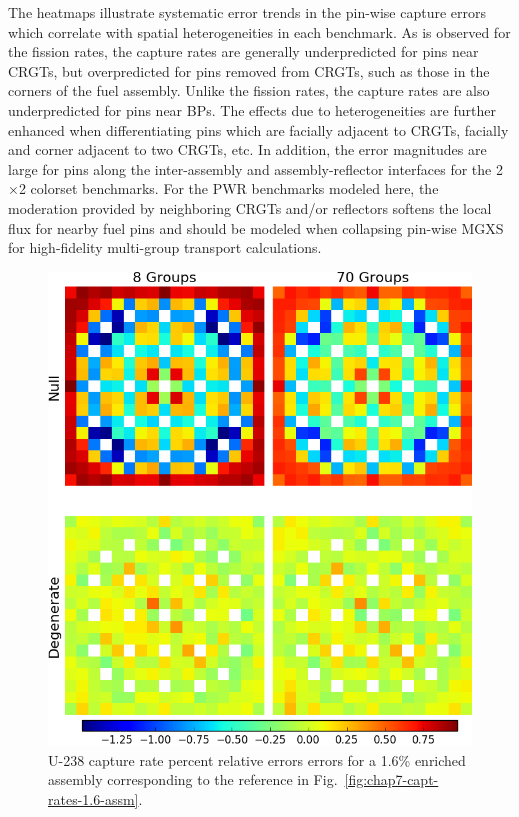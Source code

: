 The heatmaps illustrate systematic error trends in the pin-wise capture errors which correlate with spatial heterogeneities in each benchmark. As is observed for the fission rates, the capture rates are generally underpredicted for pins near \acp{CRGT}, but overpredicted for pins removed from \acp{CRGT}, such as those in the corners of the fuel assembly. Unlike the fission rates, the capture rates are also underpredicted for pins near \acp{BP}. The effects due to heterogeneities are further enhanced when differentiating pins which are facially adjacent to \acp{CRGT}, facially and corner adjacent to two \acp{CRGT}, etc. In addition, the error magnitudes are large for pins along the inter-assembly and assembly-reflector interfaces for the 2$\times$2 colorset benchmarks. For the \ac{PWR} benchmarks modeled here, the moderation provided by neighboring \acp{CRGT} and/or reflectors softens the local flux for nearby fuel pins and should be modeled when collapsing pin-wise \ac{MGXS} for high-fidelity multi-group transport calculations.

\begin{figure}[h!]
\centering
\includegraphics[width=\linewidth]{figures/quantification/assm-16/capt-err}
\vspace{2mm}
\caption[U-238 capture rate errors for a 1.6\% enriched assembly]{U-238 capture rate percent relative errors errors for a 1.6\% enriched assembly corresponding to the reference in Fig.~\ref{fig:chap7-capt-rates-1.6-assm}.}
\label{fig:chap8-assm-1.6-capt-err}
\end{figure}

